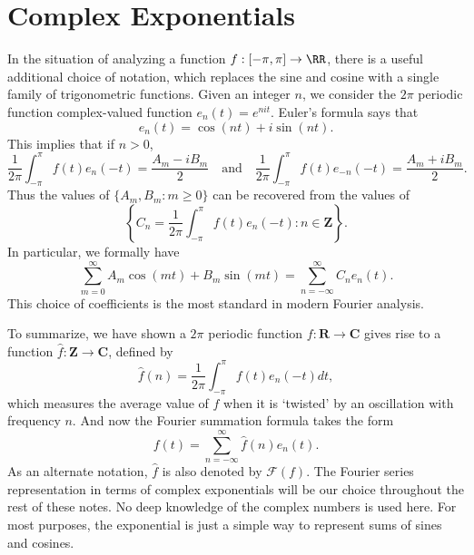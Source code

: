 \section{Complex Exponentials}

In the situation of analyzing a function $f: [-\pi,\pi] \to \RR$, there is a useful additional choice of notation, which replaces the sine and cosine with a single family of trigonometric functions. Given an integer $n$, we consider the $2\pi$ periodic function complex-valued function $e_n(t) = e^{nit}$. Euler's formula says that
%
\[ e_n(t) = \cos(nt) + i \sin(nt). \]
%
This implies that if $n > 0$,
%
\[ \frac{1}{2\pi} \int_{-\pi}^\pi f(t) e_n(-t) = \frac{A_m - iB_m}{2} \quad\text{and}\quad \frac{1}{2 \pi} \int_{-\pi}^\pi f(t) e_{-n}(-t) = \frac{A_m + iB_m}{2}. \]
%
Thus the values of $\{ A_m, B_m : m \geq 0 \}$ can be recovered from the values of
%
\[ \left\{ C_n = \frac{1}{2\pi} \int_{-\pi}^\pi f(t) e_n(-t) : n \in \mathbf{Z} \right\}. \]
%
In particular, we formally have
%
\[ \sum_{m = 0}^\infty A_m \cos(mt) + B_m \sin(mt) = \sum_{n = -\infty}^\infty C_n e_n(t). \]
%
This choice of coefficients is the most standard in modern Fourier analysis.

To summarize, we have shown a $2 \pi$ periodic function $f: \mathbf{R} \to \mathbf{C}$ gives rise to a function $\widehat{f}: \mathbf{Z} \to \mathbf{C}$, defined by
%
\[ \widehat{f}(n) = \frac{1}{2\pi} \int_{-\pi}^\pi f(t) e_n(-t) dt, \]
%
which measures the average value of $f$ when it is `twisted' by an oscillation with frequency $n$. And now the Fourier summation formula takes the form
%
\[ f(t) = \sum_{n = -\infty}^\infty \widehat{f}(n) e_n(t). \]
%
As an alternate notation, $\widehat{f}$ is also denoted by $\mathcal{F}(f)$. The Fourier series representation in terms of complex exponentials will be our choice throughout the rest of these notes. No deep knowledge of the complex numbers is used here. For most purposes, the exponential is just a simple way to represent sums of sines and cosines.

%


